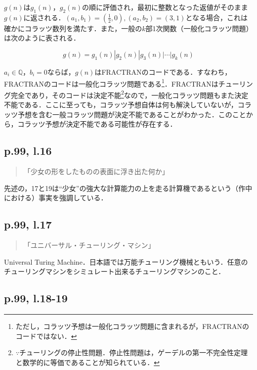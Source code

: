 \documentclass[10pt, a5paper, twoside]{jsarticle}
\theoremstyle{definition}
\begin{document}
			$g(n)$は$g_1(n)$，$g_2(n)$の順に評価され，最初に整数となった返値がそのまま$g(n)$に返される．$(a_1, b_1) = (\frac{1}{2}, 0), (a_2, b_2) = (3, 1)$となる場合，これは確かにコラッツ数列を満たす．また，一般の$k$部1次関数（一般化コラッツ問題）は次のように表される．

			$$g(n) = g_1(n) | g_2(n) | g_3(n) | \cdots | g_k(n)$$

			$a_i \in \mathbb{Q}$，$b_i = 0$ならば，$g(n)$はFRACTRANのコードである．すなわち，FRACTRANのコードは一般化コラッツ問題である\footnote{ただし，コラッツ予想は一般化コラッツ問題に含まれるが，FRACTRANのコードではない．}．FRACTRANはチューリング完全であり，そのコードは決定不能\footnote{$\because$チューリングの停止性問題．停止性問題は，ゲーデルの第一不完全性定理と数学的に等価であることが知られている．}なので，一般化コラッツ問題もまた決定不能である．ここに至っても，コラッツ予想自体は何も解決していないが，コラッツ予想を含む一般コラッツ問題が決定不能であることがわかった．このことから，コラッツ予想が決定不能である可能性が存在する．

		\subsection{p.99, l.16}

			\begin{quote}

				「少女の形をしたものの表面に浮き出た何か」

			\end{quote}

			先述の，17と19は“少女”の強大な計算能力の上を走る計算機であるという（作中における）事実を強調している．

		\subsection{p.99, l.17}

			\begin{quote}

				「ユニバーサル・チューリング・マシン」
				
			\end{quote}

			Universal Turing Machine．日本語では万能チューリング機械ともいう．任意のチューリングマシンをシミュレート出来るチューリングマシンのこと．

		\subsection{p.99, l.18-19}
\end{document}
